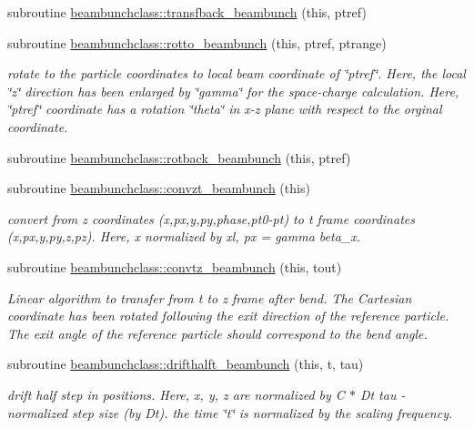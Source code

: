 \begin{DoxyCompactItemize}
subroutine \mbox{\hyperlink{namespacebeambunchclass_a89d32b2a56cd1eb84867e95897af307a}{beambunchclass\+::transfback\+\_\+beambunch}} (this, ptref)
\item 
subroutine \mbox{\hyperlink{namespacebeambunchclass_a05e93a990ca0c8071c035d078ffb7bb0}{beambunchclass\+::rotto\+\_\+beambunch}} (this, ptref, ptrange)
\begin{DoxyCompactList}\small\item\em rotate to the particle coordinates to local beam coordinate of \char`\"{}ptref\char`\"{}. Here, the local \char`\"{}z\char`\"{} direction has been enlarged by \char`\"{}gamma\char`\"{} for the space-\/charge calculation. Here, \char`\"{}ptref\char`\"{} coordinate has a rotation \char`\"{}theta\char`\"{} in x-\/z plane with respect to the orginal coordinate. \end{DoxyCompactList}\item 
subroutine \mbox{\hyperlink{namespacebeambunchclass_a3b4334f47908375d6a6dc12f1509397c}{beambunchclass\+::rotback\+\_\+beambunch}} (this, ptref)
\item 
subroutine \mbox{\hyperlink{namespacebeambunchclass_a82f485cba1b5e039b1a25b4b4bd9d81f}{beambunchclass\+::convzt\+\_\+beambunch}} (this)
\begin{DoxyCompactList}\small\item\em convert from z coordinates (x,px,y,py,phase,pt0-\/pt) to t frame coordinates (x,px,y,py,z,pz). Here, x normalized by xl, px = gamma beta\+\_\+x. \end{DoxyCompactList}\item 
subroutine \mbox{\hyperlink{namespacebeambunchclass_a9d14e9a28575e2d4d173669b8e0356a7}{beambunchclass\+::convtz\+\_\+beambunch}} (this, tout)
\begin{DoxyCompactList}\small\item\em Linear algorithm to transfer from t to z frame after bend. The Cartesian coordinate has been rotated following the exit direction of the reference particle. The exit angle of the reference particle should correspond to the bend angle. \end{DoxyCompactList}\item 
subroutine \mbox{\hyperlink{namespacebeambunchclass_a8970622c75fe29b57d31607d71692976}{beambunchclass\+::drifthalft\+\_\+beambunch}} (this, t, tau)
\begin{DoxyCompactList}\small\item\em drift half step in positions. Here, x, y, z are normalized by C $\ast$ Dt tau -\/ normalized step size (by Dt). the time \char`\"{}t\char`\"{} is normalized by the scaling frequency. \end{DoxyCompactList}\item 

\end{DoxyCompactItemize}
